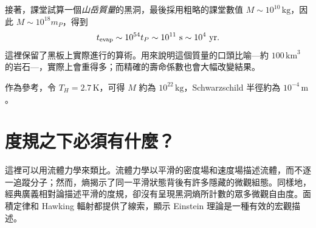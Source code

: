 接著，課堂試算一個\emph{山岳質量}的黑洞，最後採用粗略的課堂數值 \(M\sim10^{10}\,\mathrm{kg}\)，因此 \(M\sim10^{18}m_P\)，得到
\begin{equation}
t_{\mathrm{evap}}\sim10^{54}t_P
\sim10^{11}\ {\rm s}
\sim10^4\ {\rm yr}.
\end{equation}
這裡保留了黑板上實際進行的算術。用來說明這個質量的口頭比喻---約 \(100\,\mathrm{km}^3\) 的岩石---，實際上會重得多；而精確的壽命係數也會大幅改變結果。

\begin{classroomqa}
\end{classroomqa}

\begin{classroomqa}
\end{classroomqa}

作為參考，令 \(T_H=2.7\,\mathrm{K}\)，可得 \(M\) 約為 \(10^{22}\,\mathrm{kg}\)，Schwarzschild 半徑約為 \(10^{-4}\,\mathrm{m}\)。

\section{度規之下必須有什麼？}

\begin{classroomqa}
\end{classroomqa}

這裡可以用流體力學來類比。流體力學以平滑的密度場和速度場描述流體，而不逐一追蹤分子；然而，熵揭示了同一平滑狀態背後有許多隱藏的微觀組態。同樣地，經典廣義相對論描述平滑的度規，卻沒有呈現黑洞熵所計數的眾多微觀自由度。面積定律和 Hawking 輻射都提供了線索，顯示 Einstein 理論是一種有效的宏觀描述。

